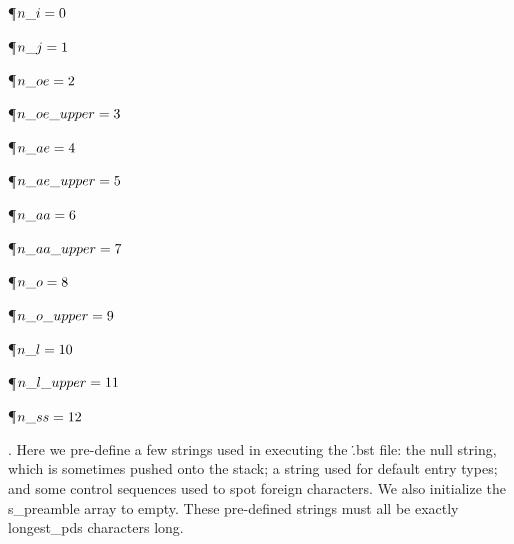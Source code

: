 \Y\P\D {}$\\{n\_i}=0$\par
\P\D {}$\\{n\_j}=1$\par
\P\D {}$\\{n\_oe}=2$\par
\P\D {}$\\{n\_oe\_upper}=3$\par
\P\D {}$\\{n\_ae}=4$\par
\P\D {}$\\{n\_ae\_upper}=5$\par
\P\D {}$\\{n\_aa}=6$\par
\P\D {}$\\{n\_aa\_upper}=7$\par
\P\D {}$\\{n\_o}=8$\par
\P\D {}$\\{n\_o\_upper}=9$\par
\P\D {}$\\{n\_l}=10$\par
\P\D {}$\\{n\_l\_upper}=11$\par
\P\D {}$\\{n\_ss}=12$\par
\fi

.
Here we pre-define a few strings used in executing the \.{.bst} file:
the null string, which is sometimes pushed onto the stack; a string
used for default entry types; and some control sequences used to spot
foreign characters.  We also initialize the \\{s\_preamble} array to
empty.  These pre-defined strings must all be exactly \\{longest\_pds}
characters long.

